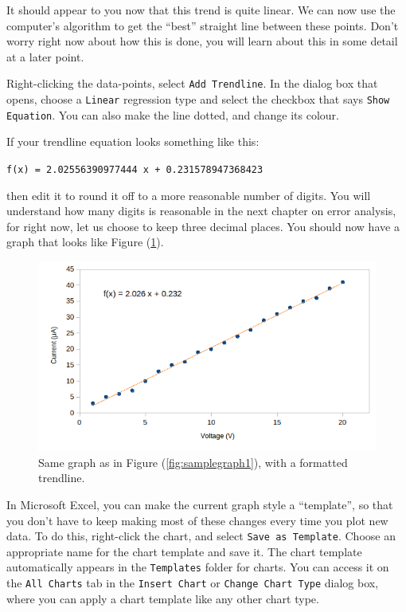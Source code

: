 It should appear to you now that this trend is quite linear. We can now use the computer's algorithm to get the ``best'' straight line between these points. Don't worry right now about how this is done, you will learn about this in some detail at a later point.

Right-clicking the data-points, select \texttt{Add Trendline}. In the dialog box that opens, choose a \texttt{Linear} regression type and select the checkbox that says \texttt{Show Equation}. You can also make the line dotted, and change its colour. 

If your trendline equation looks something like this:
\begin{center}
    \texttt{f(x) = 2.02556390977444 x + 0.231578947368423}
\end{center}

then edit it to round it off to a more reasonable number of digits. You will understand how many digits is reasonable in the next chapter on error analysis, for right now, let us choose to keep three decimal places. You should now have a graph that looks like Figure (\ref{fig:samplegraph3}).

\begin{figure}[!htb]
    \centering
    \includegraphics[scale=0.8]{figs/samplegraph3.png}
    \caption{Same graph as in Figure (\ref{fig:samplegraph1}), with a formatted trendline.}
    \label{fig:samplegraph3}
\end{figure}

\begin{tip}
In Microsoft Excel, you can make the current graph style a ``template'', so that you don't have to keep making most of these changes every time you plot new data. To do this, right-click the chart, and select \texttt{Save as Template}. Choose an appropriate name for the chart template and save it. The chart template automatically appears in the \texttt{Templates} folder for charts. You can access it on the \texttt{All Charts} tab in the \texttt{Insert Chart} or \texttt{Change Chart Type} dialog box, where you can apply a chart template like any other chart type.
\end{tip}



\newpage